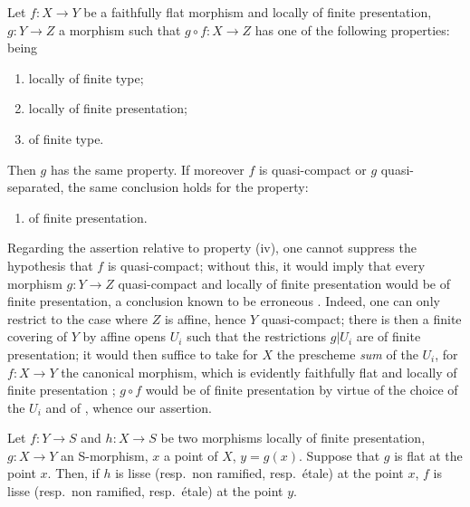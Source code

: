 \begin{lemma}[17.7.5]
\label{IV.17.7.5}
Let $f:X\to Y$ be a faithfully flat morphism and locally of finite presentation, $g:Y\to Z$ a morphism such that $g\circ f:X\to Z$ has one of the following properties: being
\begin{enumerate}[label=(\roman*)]
  \item locally of finite type;
  \item locally of finite presentation;
  \item of finite type.
\end{enumerate}
Then $g$ has the same property.
If moreover $f$ is quasi-compact or $g$ quasi-separated, the same conclusion holds for the property:
\begin{enumerate}
  \item[(iv)] of finite presentation.
\end{enumerate}
\end{lemma}

\begin{remark}[17.7.6]
\label{IV.17.7.6}
Regarding the assertion relative to property (iv), one cannot suppress the hypothesis that $f$ is quasi-compact; without this, it would imply that every morphism $g:Y\to Z$ quasi-compact and locally of finite presentation would be of finite presentation, a conclusion known to be erroneous .
Indeed, one can only restrict to the case where $Z$ is affine, hence $Y$ quasi-compact; there is then a finite covering of $Y$ by affine opens $U_i$ such that the restrictions $g|U_i$ are of finite presentation; it would then suffice to take for $X$ the prescheme \emph{sum} of the $U_i$, for $f:X\to Y$ the canonical morphism, which is evidently faithfully flat and locally of finite presentation ; $g\circ f$ would be of finite presentation by virtue of the choice of the $U_i$ and of , whence our assertion.
\end{remark}


\begin{proposition}[17.7.7]
\label{IV.17.7.7}
Let $f:Y\to S$ and $h:X\to S$ be two morphisms locally of finite presentation, $g:X\to Y$ an S-morphism, $x$ a point of $X$, $y=g(x)$.
Suppose that $g$ is flat at the point $x$.
Then, if $h$ is lisse (resp.\ non ramified, resp.\ \'etale) at the point $x$, $f$ is lisse (resp.\ non ramified, resp.\ \'etale) at the point $y$.
\end{proposition}

